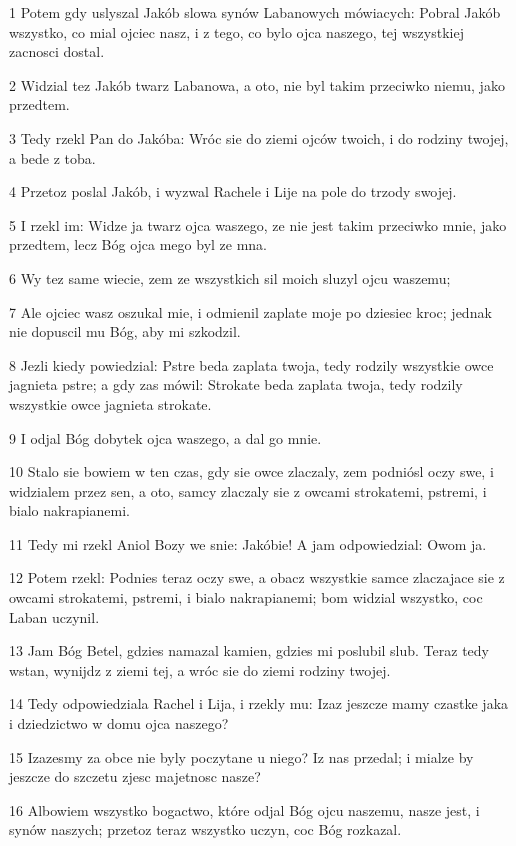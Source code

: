 \par 1 Potem gdy uslyszal Jakób slowa synów Labanowych mówiacych: Pobral Jakób wszystko, co mial ojciec nasz, i z tego, co bylo ojca naszego, tej wszystkiej zacnosci dostal.
\par 2 Widzial tez Jakób twarz Labanowa, a oto, nie byl takim przeciwko niemu, jako przedtem.
\par 3 Tedy rzekl Pan do Jakóba: Wróc sie do ziemi ojców twoich, i do rodziny twojej, a bede z toba.
\par 4 Przetoz poslal Jakób, i wyzwal Rachele i Lije na pole do trzody swojej.
\par 5 I rzekl im: Widze ja twarz ojca waszego, ze nie jest takim przeciwko mnie, jako przedtem, lecz Bóg ojca mego byl ze mna.
\par 6 Wy tez same wiecie, zem ze wszystkich sil moich sluzyl ojcu waszemu;
\par 7 Ale ojciec wasz oszukal mie, i odmienil zaplate moje po dziesiec kroc; jednak nie dopuscil mu Bóg, aby mi szkodzil.
\par 8 Jezli kiedy powiedzial: Pstre beda zaplata twoja, tedy rodzily wszystkie owce jagnieta pstre; a gdy zas mówil: Strokate beda zaplata twoja, tedy rodzily wszystkie owce jagnieta strokate.
\par 9 I odjal Bóg dobytek ojca waszego, a dal go mnie.
\par 10 Stalo sie bowiem w ten czas, gdy sie owce zlaczaly, zem podniósl oczy swe, i widzialem przez sen, a oto, samcy zlaczaly sie z owcami strokatemi, pstremi, i bialo nakrapianemi.
\par 11 Tedy mi rzekl Aniol Bozy we snie: Jakóbie! A jam odpowiedzial: Owom ja.
\par 12 Potem rzekl: Podnies teraz oczy swe, a obacz wszystkie samce zlaczajace sie z owcami strokatemi, pstremi, i bialo nakrapianemi; bom widzial wszystko, coc Laban uczynil.
\par 13 Jam Bóg Betel, gdzies namazal kamien, gdzies mi poslubil slub. Teraz tedy wstan, wynijdz z ziemi tej, a wróc sie do ziemi rodziny twojej.
\par 14 Tedy odpowiedziala Rachel i Lija, i rzekly mu: Izaz jeszcze mamy czastke jaka i dziedzictwo w domu ojca naszego?
\par 15 Izazesmy za obce nie byly poczytane u niego? Iz nas przedal; i mialze by jeszcze do szczetu zjesc majetnosc nasze?
\par 16 Albowiem wszystko bogactwo, które odjal Bóg ojcu naszemu, nasze jest, i synów naszych; przetoz teraz wszystko uczyn, coc Bóg rozkazal.
